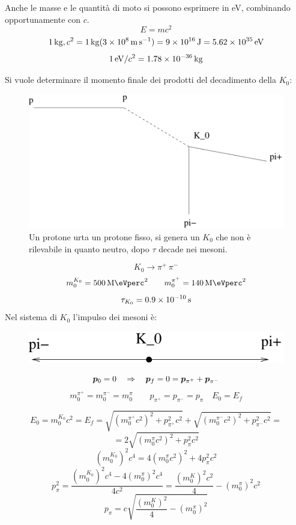 Anche le masse e le quantità di moto si possono esprimere in \si{\electronvolt}, combinando opportunamente con $c$.
\[E=mc^2\]
\[\SI{1}{\kilo\gram},c^2=\SI{1}{\kilo\gram}(\SI{3E8}{\metre\per\second})=\SI{9E16}{\joule}=\SI{5.62E35}{\electronvolt} \]
\[\SI{1}{\electronvolt}/c^2=\SI{1.78E-36}{\kilogram} \]
\begin{Es}
   Si vuole determinare il momento finale dei prodotti del decadimento della $K_0$:
   \begin{figure}[htbp]
      \centering
      \includegraphics[scale=0.5]{immagini/fisica1/dec_strano}
      \caption{Un protone urta un protone fisso, si genera un $K_0$ che non è rilevabile in quanto neutro, dopo $\tau$ decade nei mesoni.}
      \label{}
   \end{figure}
   \[K_0\rightarrow \pi^+\,\pi^-\]
   \[m_0^{K_0}=\SI[per-mode = fraction]{500}{\mega\eVperc\squared} \qquad m_0^{\pi^+}=\SI{140}{\mega\eVperc\squared}\]
   \[\tau_{K_0}=\SI{0.9E-10}{\second} \]
   Nel sistema di $K_0$ l'impulso dei mesoni è:
   \begin{figure}[htbp]
      \centering
      \includegraphics[scale=0.5]{immagini/fisica1/dec_strano2}
   \end{figure}
   \[
      \boldsymbol{p}_0=0\quad \Rightarrow \quad \boldsymbol{p}_f=0 = \boldsymbol{p}_{\pi^+}+\boldsymbol{p}_{\pi^-}
   \]
   \[
      m_0^{\pi^+}=m_0^{\pi^-}=m_0^{\pi}\qquad p_{\pi^+}=p_{\pi^-}=p_{\pi}\quad E_0=E_f
   \]

   \[E_0=m_0^{K_0}c^2=E_f=\sqrt{(m_0^{\pi^+}c^2)^2+p_{\pi^+}^2c^2}+\sqrt{(m_0^{\pi^-}c^2)^2+p_{\pi^-}^2c^2}=\]
   \[=2\sqrt{(m_0^\pi c^2)^2+p_{\pi}^2c^2}\]
   \[(m_0^{K_0})^2c^4=4(m_0^\pi c^2)^2+4p_{\pi}^2c^2\]
   \[p_\pi^2=\frac{(m_0^{K_0})^2c^4-4(m_0^{\pi})^2c^4}{4c^2}=\frac{(m_0^K)^2c^2}{4}-(m_0^\pi)^2c^2\]
   \[p_\pi=c\sqrt{\frac{(m_0^K)^2}{4}-(m_0^\pi)^2}\]
\end{Es}
